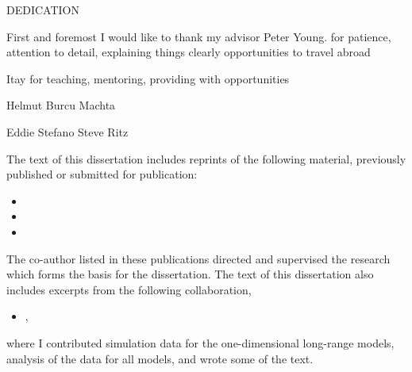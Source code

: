 \documentclass[phd]{ucbthesis}
\begin{document}
\begin{frontmatter}
  \begin{dedication}
    \begin{center}
      DEDICATION
    \end{center}
  \end{dedication}

  \tableofcontents
  \clearpage
  \listoffigures
  \clearpage
  \listoftables

  \begin{acknowledgements}
    First and foremost I would like to thank my advisor Peter Young.
    for patience, attention to detail, explaining things clearly
    opportunities to travel abroad

    Itay for teaching, mentoring, providing with opportunities

    Helmut
    Burcu
    Machta

    Eddie
    Stefano
    Steve Ritz

    The text of this dissertation includes reprints of the following material,
    previously published or submitted for publication:
    \begin{itemize}
      \item{}
      \item{}
      \item{}
    \end{itemize}
    The co-author listed in these publications directed and supervised the
    research which forms the basis for the dissertation. The text of this
    dissertation also includes excerpts from the following collaboration,
    \begin{itemize}
      \item{},
    \end{itemize}
    where I contributed simulation data for the one-dimensional long-range
    models, analysis of the data for all models, and wrote some of the text.
  \end{acknowledgements}
\end{frontmatter}

\pagestyle{headings}

\DoubleSpacing








%

\SingleSpacing

\printbibliography
\end{document}
